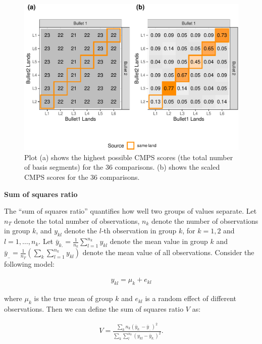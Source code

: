 \begin{figure}

{\centering \includegraphics[width=.7\textwidth]{ju-hofmann_files/figure-latex/tiles2-1} 

}

\caption{Plot (a) shows the highest possible CMPS scores (the total number of basis segments) for the 36 comparisons. (b) shows the scaled CMPS scores for the 36 comparisons.}\label{fig:tiles2}
\end{figure}

\textbf{Sum of squares ratio}

The ``sum of squares ratio'' quantifies how well two groups of values separate.
Let \(n_T\) denote the total number of observations, \(n_k\) denote the number of observations in group \(k\), and \(y_{kl}\) denote the \(l\)-th observation in group \(k\), for \(k = 1,2\) and \(l = 1, \dots, n_k\).
Let \(\bar{y}_{k.} = \frac{1}{n_k} \sum_{l=1}^{n_k} y_{kl}\) denote the mean value in group \(k\) and \(\bar{y}_{..} = \frac{1}{n_T} \left( \sum_{k} \sum_{l = 1}^{n_k} y_{kl} \right)\) denote the mean value of all observations.
Consider the following model:

\begin{align}
y_{kl} = \mu_k + e_{kl}
\end{align}

where \(\mu_k\) is the true mean of group \(k\) and \(e_{kl}\) is a random effect of different observations.
Then we can define the sum of squares ratio \(V\) as:

\begin{align}
V = \frac{\sum_k n_k \left(\bar{y}_{k.} - \bar{y}_{..} \right)^2}{\sum_k \sum_l^{n_k} \left(y_{kl} - \bar{y}_{k.} \right)^2 }.
\end{align}

